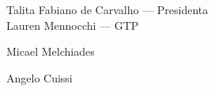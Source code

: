
\begin{CreditoInstitucional}
    Talita Fabiano de Carvalho — Presidenta\\
    Lauren Mennocchi — GTP
\end{CreditoInstitucional}


\begin{CreditoInstitucional}
    Micael Melchiades
\end{CreditoInstitucional}


\begin{CreditoInstitucional}
    Angelo Cuissi
\end{CreditoInstitucional}